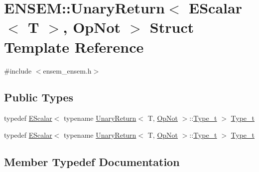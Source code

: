 \hypertarget{structENSEM_1_1UnaryReturn_3_01EScalar_3_01T_01_4_00_01OpNot_01_4}{}\section{E\+N\+S\+EM\+:\+:Unary\+Return$<$ E\+Scalar$<$ T $>$, Op\+Not $>$ Struct Template Reference}
\label{structENSEM_1_1UnaryReturn_3_01EScalar_3_01T_01_4_00_01OpNot_01_4}


{\ttfamily \#include $<$ensem\+\_\+ensem.\+h$>$}

\subsection*{Public Types}
\begin{DoxyCompactItemize}
\item 
typedef \mbox{\hyperlink{classENSEM_1_1EScalar}{E\+Scalar}}$<$ typename \mbox{\hyperlink{structENSEM_1_1UnaryReturn}{Unary\+Return}}$<$ T, \mbox{\hyperlink{structENSEM_1_1OpNot}{Op\+Not}} $>$\+::\mbox{\hyperlink{structENSEM_1_1UnaryReturn_3_01EScalar_3_01T_01_4_00_01OpNot_01_4_a4e2b815087a9bd3d66be855deee7a1e5}{Type\+\_\+t}} $>$ \mbox{\hyperlink{structENSEM_1_1UnaryReturn_3_01EScalar_3_01T_01_4_00_01OpNot_01_4_a4e2b815087a9bd3d66be855deee7a1e5}{Type\+\_\+t}}
\item 
typedef \mbox{\hyperlink{classENSEM_1_1EScalar}{E\+Scalar}}$<$ typename \mbox{\hyperlink{structENSEM_1_1UnaryReturn}{Unary\+Return}}$<$ T, \mbox{\hyperlink{structENSEM_1_1OpNot}{Op\+Not}} $>$\+::\mbox{\hyperlink{structENSEM_1_1UnaryReturn_3_01EScalar_3_01T_01_4_00_01OpNot_01_4_a4e2b815087a9bd3d66be855deee7a1e5}{Type\+\_\+t}} $>$ \mbox{\hyperlink{structENSEM_1_1UnaryReturn_3_01EScalar_3_01T_01_4_00_01OpNot_01_4_a4e2b815087a9bd3d66be855deee7a1e5}{Type\+\_\+t}}
\end{DoxyCompactItemize}


\subsection{Member Typedef Documentation}
\mbox{\label{structENSEM_1_1UnaryReturn_3_01EScalar_3_01T_01_4_00_01OpNot_01_4_a4e2b815087a9bd3d66be855deee7a1e5}} 
